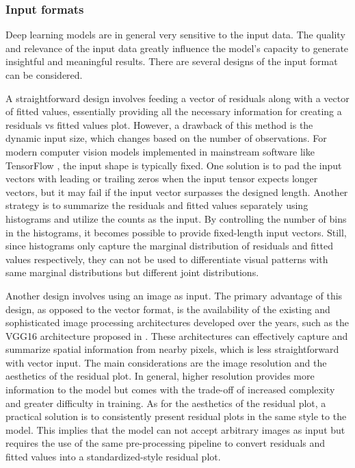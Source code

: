 \documentclass[]{interact}
\theoremstyle{plain}%
\theoremstyle{definition}
\theoremstyle{remark}
\begin{document}
\subsubsection{Input formats}\label{input-formats}

Deep learning models are in general very sensitive to the input data.
The quality and relevance of the input data greatly influence the
model's capacity to generate insightful and meaningful results. There
are several designs of the input format can be considered.

A straightforward design involves feeding a vector of residuals along
with a vector of fitted values, essentially providing all the necessary
information for creating a residuals vs fitted values plot. However, a
drawback of this method is the dynamic input size, which changes based
on the number of observations. For modern computer vision models
implemented in mainstream software like TensorFlow
\citep{abadi2016tensorflow}, the input shape is typically fixed. One
solution is to pad the input vectors with leading or trailing zeros when
the input tensor expects longer vectors, but it may fail if the input
vector surpasses the designed length. Another strategy is to summarize
the residuals and fitted values separately using histograms and utilize
the counts as the input. By controlling the number of bins in the
histograms, it becomes possible to provide fixed-length input vectors.
Still, since histograms only capture the marginal distribution of
residuals and fitted values respectively, they can not be used to
differentiate visual patterns with same marginal distributions but
different joint distributions.

Another design involves using an image as input. The primary advantage
of this design, as opposed to the vector format, is the availability of
the existing and sophisticated image processing architectures developed
over the years, such as the VGG16 architecture proposed in
\citet{simonyan2014very}. These architectures can effectively capture
and summarize spatial information from nearby pixels, which is less
straightforward with vector input. The main considerations are the image
resolution and the aesthetics of the residual plot. In general, higher
resolution provides more information to the model but comes with the
trade-off of increased complexity and greater difficulty in training. As
for the aesthetics of the residual plot, a practical solution is to
consistently present residual plots in the same style to the model. This
implies that the model can not accept arbitrary images as input but
requires the use of the same pre-processing pipeline to convert
residuals and fitted values into a standardized-style residual plot.
\end{document}
